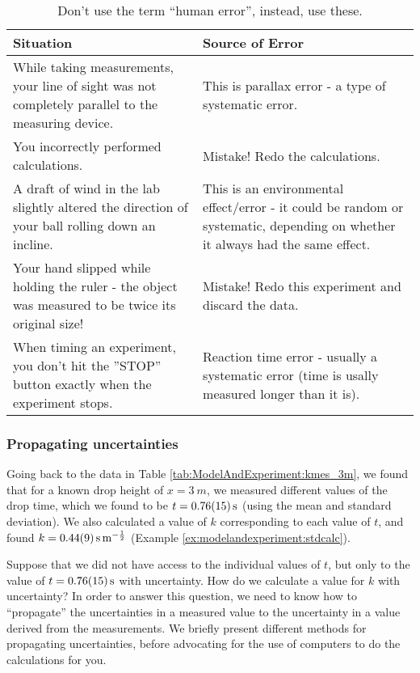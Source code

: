 \begin{table}[H]
\centering
\begin{tabular}{p{3in}p{3in}} 
\textbf{Situation} &\textbf{Source of Error} \\
\hline
\hline
While taking measurements, your line of sight was not completely parallel to the measuring device. & This is parallax error - a type of systematic error.\\ \hline
You incorrectly performed calculations. & Mistake! Redo the calculations.\\ \hline
A draft of wind in the lab slightly altered the direction of your ball rolling down an incline. & This is an environmental effect/error - it could be random or systematic, depending on whether it always had the same effect.\\ \hline
Your hand slipped while holding the ruler - the object was measured to be twice its original size! & Mistake! Redo this experiment and discard the data.\\ \hline
When timing an experiment, you don't hit the ''STOP'' button exactly when the experiment stops. & Reaction time error - usually a systematic error (time is usally measured longer than it is).\\ \hline
\end{tabular}
\caption{\label{tab:ModelAndExperiment:uncertainties} Don't use the term ``human error'', instead, use these.}
\end{table}

\subsubsection{Propagating uncertainties}
Going back to the data in Table \ref{tab:ModelAndExperiment:kmes_3m}, we found that for a known drop height of $x=\SI{3}{m}$, we measured different values of the drop time, which we found to be $t=\SI{0.76 \pm 0.15}{s}$ (using the mean and standard deviation). We also calculated a value of $k$ corresponding to each value of $t$, and found $k=\SI{0.44 \pm 0.09}{s.m^{-\frac{1}{2}}}$ (Example \ref{ex:modelandexperiment:stdcalc}).

Suppose that we did not have access to the individual values of $t$, but only to the value of $t=\SI{0.76 \pm 0.15}{s}$ with uncertainty. How do we calculate a value for $k$ with uncertainty? In order to answer this question, we need to know how to ``propagate'' the uncertainties in a measured value to the uncertainty in a value derived from the measurements. We briefly present different methods for propagating uncertainties, before advocating for the use of computers to do the calculations for you.

